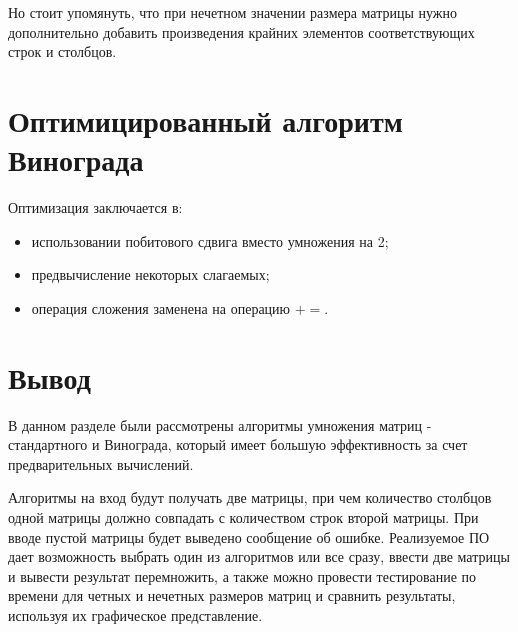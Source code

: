Но стоит упомянуть, что при нечетном значении размера матрицы нужно дополнительно добавить произведения крайних элементов соответствующих строк и столбцов.

\section{Оптимицированный алгоритм Винограда}

Оптимизация заключается в:
\begin{itemize}
    \item использовании побитового сдвига вместо умножения на 2;
    \item предвычисление некоторых слагаемых;
    \item операция сложения заменена на операцию $+=$. \newline
\end{itemize}

\section{Вывод}

В данном разделе были рассмотрены алгоритмы умножения матриц - стандартного и Винограда, который имеет большую эффективность за счет предварительных вычислений.

Алгоритмы на вход будут получать две матрицы, при чем количество столбцов одной матрицы должно совпадать с количеством строк второй матрицы. При вводе пустой матрицы будет выведено сообщение об ошибке. Реализуемое ПО дает возможность выбрать один из алгоритмов или все сразу, ввести две матрицы и вывести результат перемножить, а также можно провести тестирование по времени для четных и нечетных размеров матриц и сравнить результаты, используя их графическое представление.
